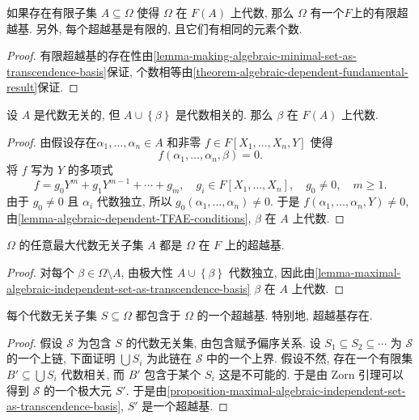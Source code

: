 \begin{theorem}
  \label{theorem-finite-transcendence-basis}
  如果存在有限子集 \( A \subseteq \Omega \) 使得 \( \Omega \) 在 \( F(A) \)
  上代数, 那么 \( \Omega \) 有一个\( F \)上的有限超越基.
  另外, 每个超越基是有限的, 且它们有相同的元素个数.
\end{theorem}
\begin{proof}
  有限超越基的存在性由\cref{lemma-making-algebraic-minimal-set-as-transcendence-basis}保证,
  个数相等由\cref{theorem-algebraic-dependent-fundamental-result}保证.
\end{proof}

\begin{lemma}
  \label{lemma-maximal-algebraic-independent-set-as-transcendence-basis}
  设 \( A \) 是代数无关的, 但 \( A \cup \left\lbrace \beta \right\rbrace \)
  是代数相关的. 那么 \( \beta \) 在 \( F(A) \) 上代数.
\end{lemma}
\begin{proof}
  由假设存在\( \alpha_1, \ldots, \alpha_n \in A \) 和非零 \( f \in F[X_1,
  \ldots, X_n, Y] \) 使得
  \[
    f(\alpha_1, \ldots, \alpha_n, \beta) = 0.
  \]
  将 \( f \) 写为 \( Y \) 的多项式
  \[
    f = g_0 Y^m + g_1 Y^{m - 1} + \cdots + g_m,\quad g_i \in F[X_1, \ldots,
    X_n],\quad g_0 \neq 0,\quad m \geq 1.
  \]
  由于 \( g_0 \neq 0 \) 且 \( \alpha_i \) 代数独立, 所以 \( g_0(\alpha_1,
  \ldots, \alpha_n) \neq 0 \).
  于是 \( f(\alpha_1, \ldots, \alpha_n, Y) \neq 0 \),
  由\cref{lemma-algebraic-dependent-TFAE-conditions}, \( \beta \) 在 \( A \)
  上代数.
\end{proof}

\begin{proposition}
  \label{proposition-maximal-algebraic-independent-set-as-transcendence-basis}
  \( \Omega \) 的任意最大代数无关子集 \( A \) 都是 \( \Omega \) 在 \( F \)
  上的超越基.
\end{proposition}
\begin{proof}
  对每个 \( \beta \in \Omega \setminus A \), 由极大性 \( A \cup \left\lbrace
  \beta \right\rbrace \) 代数独立,
  因此由\cref{lemma-maximal-algebraic-independent-set-as-transcendence-basis} \(
  \beta\) 在 \( A \) 上代数.
\end{proof}

\begin{theorem}
  每个代数无关子集 \( S \subseteq \Omega \) 都包含于 \( \Omega \) 的一个超越基.
  特别地, 超越基存在.
\end{theorem}
\begin{proof}
  假设 \( \mathcal{S} \) 为包含 \( S \) 的代数无关集, 由包含赋予偏序关系.
  设 \( S_1 \subseteq S_2 \subseteq \cdots \) 为 \( \mathcal{S} \) 的一个上链,
  下面证明 \( \bigcup S_i \) 为此链在 \( \mathcal{S} \) 中的一个上界.
  假设不然, 存在一个有限集 \( B' \subseteq \bigcup S_i \) 代数相关, 而 \( B' \)
  包含于某个 \( S_i \) 这是不可能的.
  于是由 Zorn 引理可以得到 \( \mathcal{S} \) 的一个极大元 \( S' \).
  于是由\cref{proposition-maximal-algebraic-independent-set-as-transcendence-basis},
  \( S' \) 是一个超越基.
\end{proof}

